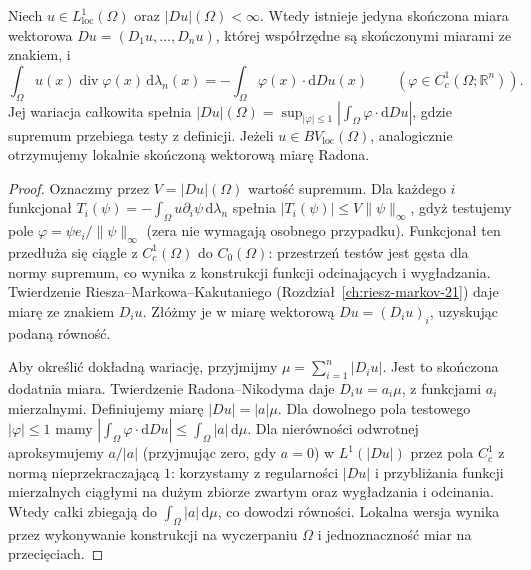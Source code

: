\begin{twierdzenie}
\label{thm:BV-measure-29}
Niech $u\in L^1_{\mathrm{loc}}(\Omega)$ oraz
$|Du|(\Omega)<\infty$. Wtedy istnieje jedyna
skończona miara wektorowa $Du=(D_1u,\ldots,D_nu)$,
której współrzędne są skończonymi miarami ze znakiem,
i
\[
 \int_\Omega u(x)\operatorname{div}\varphi(x)
 \,\mathrm d\lambda_n(x)
 =-\int_\Omega\varphi(x)\cdot\mathrm dDu(x)
 \qquad(\varphi\in C_c^1(\Omega;\mathbb R^n)).
\]
Jej wariacja całkowita spełnia
$|Du|(\Omega)=\sup_{|\varphi|\le1}|
\int_\Omega \varphi\cdot\mathrm dDu|$,
gdzie supremum przebiega testy z definicji.
Jeżeli $u\in BV_{\mathrm{loc}}(\Omega)$,
analogicznie otrzymujemy lokalnie skończoną
wektorową miarę Radona.
\end{twierdzenie}
\begin{proof}
Oznaczmy przez $V=|Du|(\Omega)$ wartość supremum.
Dla każdego $i$ funkcjonał
$T_i(\psi)=-\int_\Omega u\partial_i\psi\,\mathrm d\lambda_n$
spełnia $|T_i(\psi)|\le V\|\psi\|_\infty$,
gdyż testujemy pole $\varphi=\psi e_i/\|\psi\|_\infty$
(zera nie wymagają osobnego przypadku). Funkcjonał ten
przedłuża się ciągle z $C_c^1(\Omega)$ do $C_0(\Omega)$:
przestrzeń testów jest gęsta dla normy supremum,
co wynika z konstrukcji funkcji odcinających i wygładzania.
Twierdzenie Riesza--Markowa--Kakutaniego
(Rozdział~\ref{ch:riesz-markov-21})
daje miarę ze znakiem $D_i u$. Złóżmy je w miarę wektorową
$Du=(D_iu)_i$, uzyskując podaną równość.

Aby określić dokładną wariację, przyjmijmy
$\mu=\sum_{i=1}^n|D_i u|$. Jest to skończona dodatnia
miara. Twierdzenie Radona--Nikodyma daje
$D_i u=a_i\mu$, z funkcjami $a_i$ mierzalnymi.
Definiujemy miarę $|Du|=|a|\mu$.
Dla dowolnego pola testowego $|\varphi|\le1$ mamy
$\left|\int_\Omega\varphi\cdot\mathrm dDu\right|
\le\int_\Omega|a|\,\mathrm d\mu$.
Dla nierówności odwrotnej aproksymujemy
$a/|a|$ (przyjmując zero, gdy $a=0$) w $L^1(|Du|)$
przez pola $C_c^1$ z normą nieprzekraczającą $1$:
korzystamy z regularności $|Du|$ i przybliżania
funkcji mierzalnych ciągłymi na dużym zbiorze zwartym
oraz wygładzania i odcinania. Wtedy całki zbiegają
do $\int_\Omega|a|\,\mathrm d\mu$, co dowodzi równości.
Lokalna wersja wynika przez wykonywanie konstrukcji
na wyczerpaniu $\Omega$ i jednoznaczność miar na
przecięciach.
\end{proof}

